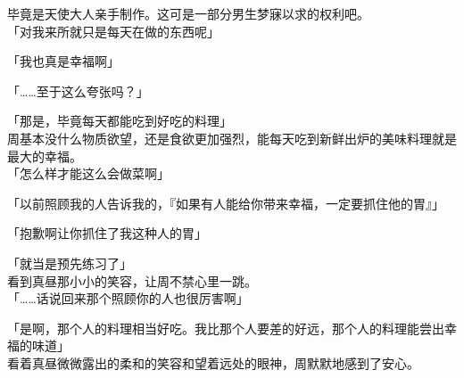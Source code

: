 毕竟是天使大人亲手制作。这可是一部分男生梦寐以求的权利吧。\\

「对我来所就只是每天在做的东西呢」

「我也真是幸福啊」

「……至于这么夸张吗？」

「那是，毕竟每天都能吃到好吃的料理」\\

周基本没什么物质欲望，还是食欲更加强烈，能每天吃到新鲜出炉的美味料理就是最大的幸福。\\

「怎么样才能这么会做菜啊」

「以前照顾我的人告诉我的，『如果有人能给你带来幸福，一定要抓住他的胃』」

「抱歉啊让你抓住了我这种人的胃」

「就当是预先练习了」\\

看到真昼那小小的笑容，让周不禁心里一跳。\\

「……话说回来那个照顾你的人也很厉害啊」

「是啊，那个人的料理相当好吃。我比那个人要差的好远，那个人的料理能尝出幸福的味道」\\

看着真昼微微露出的柔和的笑容和望着远处的眼神，周默默地感到了安心。\\

